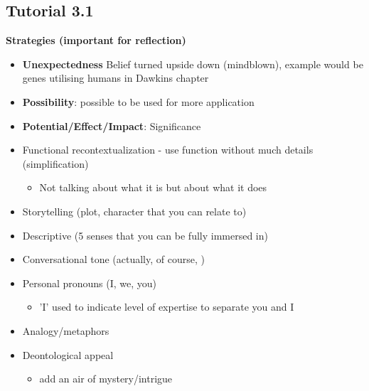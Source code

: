 \documentclass{article}
\begin{document}
\begin{multicols}{2}
\subsection{Tutorial 3.1}
\textbf{Strategies (important for reflection)}
\begin{itemize}
	\item \textbf{Unexpectedness} Belief turned upside down (mindblown), example would be genes utilising humans in Dawkins chapter
	\item \textbf{Possibility}: possible to be used for more application
	\item \textbf{Potential/Effect/Impact}: Significance
	\item Functional recontextualization - use function without much details (simplification)
	\begin{itemize}
		\item Not talking about what it is but about what it does
	\end{itemize}
	\item Storytelling (plot, character that you can relate to)
	\item Descriptive (5 senses that you can be fully immersed in)
	\item Conversational tone (actually, of course, )
	\item Personal pronouns (I, we, you)
	\begin{itemize}
		\item 'I' used to indicate level of expertise to separate you and I
	\end{itemize}
	\item Analogy/metaphors
	\item Deontological appeal
	\begin{itemize}
		\item add an air of mystery/intrigue
	\end{itemize}
\end{itemize}

\end{multicols}
\end{document}
